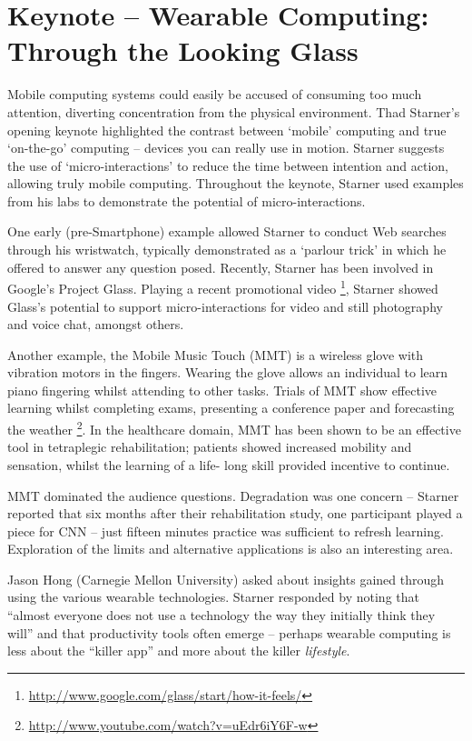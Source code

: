 \section{Keynote -- Wearable Computing: Through the Looking Glass}
\label{sec:keynote}
Mobile computing systems could easily be accused of consuming too much
attention, diverting concentration from the physical environment. Thad
Starner's opening keynote highlighted the contrast between `mobile'
computing and true `on-the-go' computing -- devices you can really use in
motion. Starner suggests the use of `micro-interactions' to reduce the time 
between intention and action, allowing truly mobile computing. Throughout the 
keynote, Starner used examples from his labs to demonstrate the potential of 
micro-interactions.


One early (pre-Smartphone) example allowed Starner to conduct Web searches 
through his wristwatch, typically demonstrated as a `parlour trick' in which 
he offered to answer any question posed. Recently, Starner has been involved in 
Google's Project Glass. Playing a recent promotional video 
\footnote{\url{http://www.google.com/glass/start/how-it-feels/}}, Starner showed 
Glass's potential to support micro-interactions for video and still 
photography and voice chat, amongst others.

Another example, the Mobile Music Touch (MMT) is a wireless glove
with vibration motors in the fingers. Wearing the glove allows an individual to
learn piano fingering whilst attending to other tasks.
Trials of MMT show effective learning whilst completing exams, presenting a
conference paper and forecasting the weather
\footnote{\url{http://www.youtube.com/watch?v=uEdr6iY6F-w}}.
In the healthcare domain,
MMT has been shown to be an effective tool in tetraplegic rehabilitation; 
patients showed increased mobility and sensation, whilst the learning of a life-
long skill provided incentive to continue.

MMT dominated the audience questions. Degradation was one concern -- Starner 
reported that six months after their rehabilitation study, one participant played 
a piece for CNN -- just fifteen minutes practice was sufficient to refresh 
learning. Exploration of the limits and alternative applications is also an 
interesting area.

Jason Hong (Carnegie Mellon University) asked about insights gained through using
the various wearable technologies. Starner responded by noting that 
``almost everyone does not use a technology the way they initially 
think they will'' and that productivity tools often emerge -- perhaps wearable 
computing is less about the ``killer app'' and more about the killer 
\emph{lifestyle}.